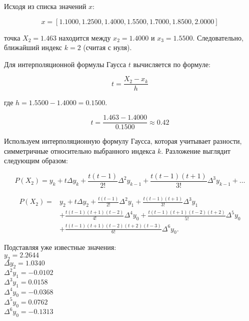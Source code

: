 \documentclass{article}
\begin{document}
                  Исходя из списка значений \( x \):

                  \[
                  x = [1.1000, 1.2500, 1.4000, 1.5500, 1.7000, 1.8500, 2.0000]
                  \]

                  точка \( X_2 = 1.463 \) находится между \( x_2 = 1.4000 \) и \( x_3 = 1.5500 \). Следовательно, ближайший индекс \( k = 2 \) (считая с нуля).

                  Для интерполяционной формулы Гаусса \( t \) вычисляется по формуле:

                  \[
                  t = \frac{X_2 - x_k}{h}
                  \]

                  где \( h = 1.5500 - 1.4000 = 0.1500 \).

                  \[
                  t = \frac{1.463 - 1.4000}{0.1500} \approx 0.42
                  \]

                  Используем интерполяционную формулу Гаусса, которая учитывает разности, симметричные относительно выбранного индекса \( k \). Разложение выглядит следующим образом:

                  \[
                  P(X_2) = y_k + t \Delta y_k + \frac{t(t-1)}{2!} \Delta^2 y_{k-1} + \frac{t(t-1)(t+1)}{3!} \Delta^3 y_{k-1} + \ldots
                  \]


                  \[
                  \begin{aligned}
                  P(X_2) = & y_2 + t \Delta y_2 + \frac{t(t-1)}{2!} \Delta^2 y_1 + \frac{t(t-1)(t+1)}{3!} \Delta^3 y_1 \\
                        & + \frac{t(t-1)(t+1)(t-2)}{4!} \Delta^4 y_0 + \frac{t(t-1)(t+1)(t-2)(t+2)}{5!} \Delta^5 y_0 \\
                        & + \frac{t(t-1)(t+1)(t-2)(t+2)(t-3)}{6!} \Delta^6 y_0.
                  \end{aligned}
                  \]

                  Подставляя уже известные значения:
                  \\
                  \( y_2 = 2.2644 \) \\
                  \( \Delta y_2 = 1.0340 \) \\
                  \( \Delta^2 y_1 = -0.0102 \) \\
                  \( \Delta^3 y_1 = 0.0158 \) \\
                  \( \Delta^4 y_0 = -0.0368 \) \\
                  \( \Delta^5 y_0 = 0.0762 \) \\
                  \( \Delta^6 y_0 = -0.1313 \) \\
\end{document}
